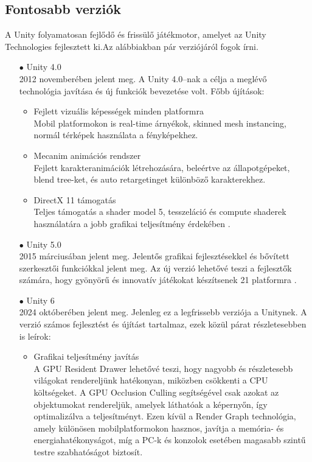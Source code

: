 \documentclass[
]{thesis-ekf}
\theoremstyle{definition}
\theoremstyle{remark}
\begin{document}
\subsection{Fontosabb verziók}
A Unity folyamatosan fejlődő és frissülő játékmotor, amelyet az Unity Technologies fejlesztett ki.Az alábbiakban pár verziójáról fogok írni.
\begin{itemize}
	\item[$\bullet$]Unity 4.0\\2012 novemberében jelent meg. A Unity 4.0--nak a célja a meglévő technológia javítása és új funkciók bevezetése volt. Főbb újítások:
	\begin{itemize}
		\item Fejlett vizuális képességek minden platformra\\Mobil platformokon is real-time árnyékok, skinned mesh instancing, normál térképek használata a fényképekhez.
		\item Mecanim animációs rendszer \\ Fejlett karakteranimációk létrehozására, beleértve az állapotgépeket, blend tree-ket, és auto retargetinget különböző karakterekhez.
		\item DirectX 11 támogatás \\ Teljes támogatás a shader model 5, tesszeláció és compute shaderek használatára a jobb grafikai teljesítmény érdekében \cite{Unity4.0}.
	\end{itemize}
	\item[$\bullet$]Unity 5.0\\2015 márciusában jelent meg. Jelentős grafikai fejlesztésekkel és bővített szerkesztői funkciókkal jelent meg. Az új verzió lehetővé teszi a fejlesztők számára, hogy gyönyörű és innovatív játékokat készítsenek 21 platformra \cite{Unity5.0}.
	\item[$\bullet$]Unity 6\\2024 októberében jelent meg. Jelenleg ez a legfrissebb verziója a Unitynek. A verzió számos fejlesztést és újítást tartalmaz, ezek közül párat részletesebben is leírok:
	\begin{itemize}
		\item Grafikai teljesítmény javítás \\A GPU Resident Drawer lehetővé teszi, hogy nagyobb és részletesebb világokat rendereljünk hatékonyan, miközben csökkenti a CPU költségeket. A GPU Occlusion Culling segítségével csak azokat az objektumokat rendereljük, amelyek láthatóak a képernyőn, így optimalizálva a teljesítményt. Ezen kívül a Render Graph technológia, amely különösen mobilplatformokon hasznos, javítja a memória- és energiahatékonyságot, míg a PC-k és konzolok esetében magasabb szintű testre szabhatóságot biztosít.

\end{itemize}
\end{itemize}
\end{document}
